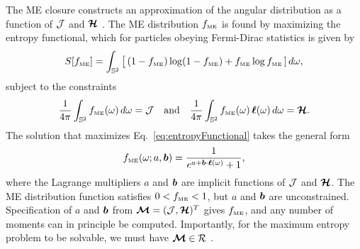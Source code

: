The ME closure constructs an approximation of the angular distribution as a function of $\mathcal{J}$ and $\boldsymbol{\mathcal{H}}$ \cite{cernohorskyBludman_1994,lareckiBanach_2011}.  
The ME distribution $f_{\mbox{\tiny ME}}$ is found by maximizing the entropy functional, which for particles obeying Fermi-Dirac statistics is given by
\begin{equation}
  S[f_{\mbox{\tiny ME}}] 
  = \int_{\mathbb{S}^{2}}\big[\,(1-f_{\mbox{\tiny ME}})\log(1-f_{\mbox{\tiny ME}}) + f_{\mbox{\tiny ME}}\log f_{\mbox{\tiny ME}}\,]\,d\omega,
  \label{eq:entropyFunctional}
\end{equation} 
subject to the constraints
\begin{equation}
  \frac{1}{4\pi}\int_{\mathbb{S}^{2}}f_{\mbox{\tiny ME}}(\omega)\,d\omega=\mathcal{J}
  \quad\text{and}\quad
  \frac{1}{4\pi}\int_{\mathbb{S}^{2}}f_{\mbox{\tiny ME}}(\omega)\,\boldsymbol{\ell}(\omega)\,d\omega=\boldsymbol{\mathcal{H}}.  
  \label{eq:closureConstraints}
\end{equation}
The solution that maximizes Eq.~\eqref{eq:entropyFunctional} takes the general form \cite{cernohorskyBludman_1994}
\begin{equation}
  f_{\mbox{\tiny ME}}(\omega;a,\boldsymbol{b})=\frac{1}{e^{a + \boldsymbol{b}\cdot\boldsymbol{\ell}(\omega)}+1}, 
  \label{eq:fME}
\end{equation}
where the Lagrange multipliers $a$ and $\boldsymbol{b}$ are implicit functions of $\mathcal{J}$ and $\boldsymbol{\mathcal{H}}$.  
The ME distribution function satisfies $0 < f_{\mbox{\tiny ME}} < 1$, but $a$ and $\boldsymbol{b}$ are unconstrained.  
Specification of $a$ and $\boldsymbol{b}$ from $\boldsymbol{\mathcal{M}}=(\mathcal{J},\boldsymbol{\mathcal{H}})^{T}$ gives $f_{\mbox{\tiny ME}}$, and any number of moments can in principle be computed.  
Importantly, for the maximum entropy problem to be solvable, we must have $\boldsymbol{\mathcal{M}}\in\mathcal{R}$ \cite{lareckiBanach_2011}.  


